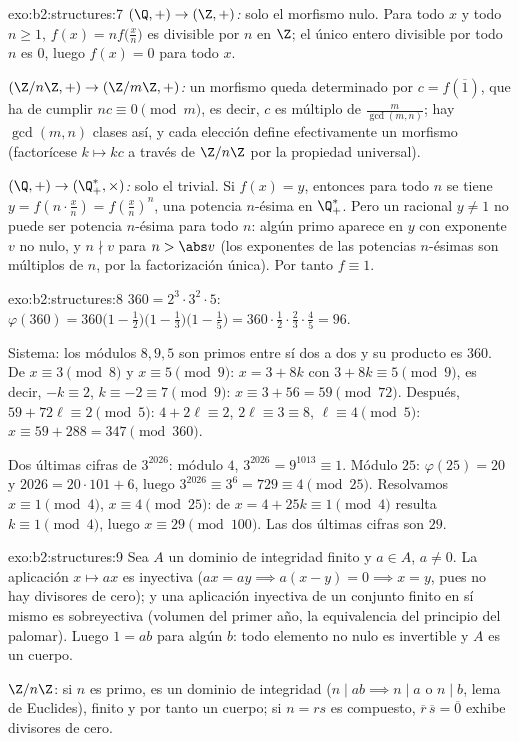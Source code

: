 \begin{solution}{exo:b2:structures:7}
\emph{$(\Q,+) \to (\Z,+)$:} solo el morfismo nulo. Para todo $x$ y
todo $n \geq 1$, $f(x) = n f\bigl(\frac xn\bigr)$ es divisible por
$n$ en $\Z$; el único entero divisible por todo $n$ es $0$, luego
$f(x) = 0$ para todo $x$.

\emph{$(\Z/n\Z, +) \to (\Z/m\Z, +)$:} un morfismo queda determinado
por $c = f(\overline 1)$, que ha de cumplir $n c \equiv 0 \pmod m$,
es decir, $c$ es múltiplo de $\frac{m}{\gcd(m,n)}$; hay $\gcd(m,n)$
clases así, y cada elección define efectivamente un morfismo
(factorícese $k \mapsto kc$ a través de $\Z/n\Z$ por la propiedad
universal).

\emph{$(\Q, +) \to (\Q_+^*, \times)$:} solo el trivial. Si $f(x) =
y$, entonces para todo $n$ se tiene $y = f(n \cdot \frac xn) =
f(\frac xn)^n$, una potencia $n$-ésima en $\Q_+^*$. Pero un racional
$y \neq 1$ no puede ser potencia $n$-ésima para todo $n$: algún primo
aparece en $y$ con exponente $v$ no nulo, y $n \nmid v$ para $n >
\abs v$ (los exponentes de las potencias $n$-ésimas son múltiplos de
$n$, por la factorización única). Por tanto $f \equiv 1$.
\end{solution}

\begin{solution}{exo:b2:structures:8}
$360 = 2^3 \cdot 3^2 \cdot 5$:
$\varphi(360) = 360\bigl(1 - \tfrac12\bigr)\bigl(1 -
\tfrac13\bigr)\bigl(1 - \tfrac15\bigr) = 360 \cdot \tfrac12 \cdot
\tfrac23 \cdot \tfrac45 = 96$.

Sistema: los módulos $8, 9, 5$ son primos entre sí dos a dos y su
producto es $360$. De $x \equiv 3 \pmod 8$ y $x \equiv 5 \pmod 9$:
$x = 3 + 8k$ con $3 + 8k \equiv 5 \pmod 9$, es decir, $-k \equiv 2$,
$k \equiv -2 \equiv 7 \pmod 9$: $x \equiv 3 + 56 = 59 \pmod{72}$.
Después, $59 + 72\ell \equiv 2 \pmod 5$: $4 + 2\ell \equiv 2$, $2\ell
\equiv 3 \equiv 8$, $\ell \equiv 4 \pmod 5$: $x \equiv 59 + 288 = 347
\pmod{360}$.

Dos últimas cifras de $3^{2026}$: módulo $4$, $3^{2026} = 9^{1013}
\equiv 1$. Módulo $25$: $\varphi(25) = 20$ y $2026 = 20\cdot101 + 6$,
luego $3^{2026} \equiv 3^6 = 729 \equiv 4 \pmod{25}$. Resolvamos $x
\equiv 1 \pmod 4$, $x \equiv 4 \pmod{25}$: de $x = 4 + 25k \equiv 1
\pmod 4$ resulta $k \equiv 1 \pmod 4$, luego $x \equiv 29 \pmod{100}$.
Las dos últimas cifras son $29$.
\end{solution}

\begin{solution}{exo:b2:structures:9}
Sea $A$ un dominio de integridad finito y $a \in A$, $a \neq 0$. La
aplicación $x \mapsto ax$ es inyectiva ($ax = ay \implies a(x - y) =
0 \implies x = y$, pues no hay divisores de cero); y una aplicación
inyectiva de un conjunto finito en sí mismo es sobreyectiva (volumen
del primer año, la equivalencia del principio del palomar). Luego $1
= ab$ para algún $b$: todo elemento no nulo es invertible y $A$ es un
cuerpo.

$\Z/n\Z$: si $n$ es primo, es un dominio de integridad ($n \mid ab
\implies n \mid a$ o $n \mid b$, lema de Euclides), finito y por
tanto un cuerpo; si $n = rs$ es compuesto, $\overline r\,\overline s
= \overline 0$ exhibe divisores de cero.
\end{solution}

